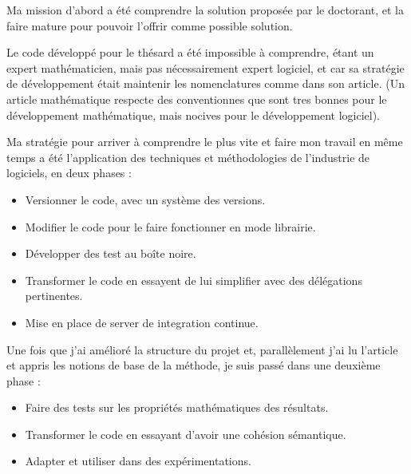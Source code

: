 \documentclass{resume} %
\begin{document}
		Ma mission d'abord a été comprendre la solution proposée par le doctorant, et la faire mature pour pouvoir l'offrir comme possible solution.  
		
		Le code développé pour le thésard  a été impossible à comprendre,  étant un expert mathématicien, mais pas nécessairement expert logiciel, et car sa stratégie  de développement était maintenir les nomenclatures comme dans son article. (Un article mathématique respecte des conventionnes que sont tres bonnes pour le développement mathématique, mais nocives pour le développement logiciel). 
		
		Ma stratégie pour arriver à comprendre le plus vite et faire mon travail en même temps a été l'application des techniques et méthodologies de l'industrie de logiciels, en deux phases : 
		
		\begin{itemize}
				\item Versionner le code, avec un système des versions.
				\item Modifier le code pour le faire fonctionner en mode librairie. 
				\item Développer des test au boîte noire.
				\item Transformer le code en essayent de lui simplifier avec des délégations pertinentes. 
				\item Mise en place de server de integration continue.
		\end {itemize}
		
		Une fois que j'ai amélioré la structure du projet et, parallèlement j'ai lu l'article et appris les notions de base de la méthode, je suis  passé dans une deuxième phase :
		\begin{itemize}
				\item Faire des tests sur les propriétés mathématiques des résultats.
				\item Transformer le code en essayant d'avoir une cohésion sémantique.
				\item Adapter et utiliser dans des expérimentations.
		\end {itemize}
\end{document}
